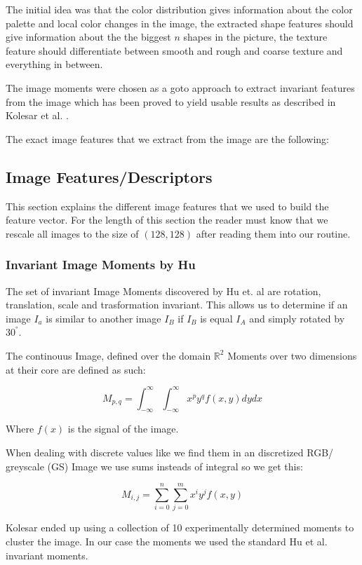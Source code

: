 \documentclass[journal]{vgtc}       %
\begin{document}
The initial idea was that the color distribution gives information about the color palette and local color changes in the image, the extracted shape features should give information about the the biggest \( n \) shapes in the picture, the texture feature should differentiate between smooth and rough and coarse texture and everything in between.

The image moments were chosen as a goto approach to extract invariant features from the image which has been proved to yield usable results as described in Kolesar et al. \cite{kolesar}.

The exact image features that we extract from the image are the following:
\subsection{Image Features/Descriptors}
This section explains the different image features that we used to build the feature vector.
For the length of this section the reader must know that we rescale all images to the size of $(128,128)$ after reading them into our routine.
\subsubsection{Invariant Image Moments by Hu}\label{subsec:humom}

The set of invariant Image Moments discovered by Hu et. al \cite{humoments}  are rotation, translation, scale and trasformation  invariant. This allows us to determine if an image $I_a$ is similar to another image $I_B$ if $I_B$ is equal $I_A$ and simply rotated by $30^°$.

The continouus  Image, defined over the domain \(\mathbb{R}^2\) Moments  over two dimensions at their core are defined as such:

\[M_{p,q} = \int^\infty_{- \infty}\int^\infty_{- \infty} x^py^q f(x,y) dy dx \]

Where \(f(x)\) is the signal of the image. 

When dealing with discrete values like we find them in an discretized RGB/ greyscale (GS) Image we use sums insteads of integral so we get this:

\[M_{i,j} = \sum^n_{i=0}\sum^m_{j=0} x^i y^j f(x,y) \]



Kolesar ended up using a collection of 10 experimentally determined moments to cluster the image. In our case the moments we used the standard Hu et al. invariant moments. 
\end{document}
